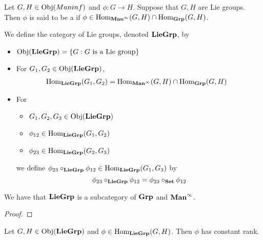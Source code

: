 \documentclass{book}
\begin{document}
\begin{ex}
	Let $G, H \in \Obj(Maninf)$ and $\phi: G \rightarrow H$. Suppose that $G, H$ are Lie groups. Then $\phi$ is said to be a  if $\phi \in \Hom_{\Maninf}(G, H) \cap \Hom_{\Grp}(G, H)$.
\end{ex}

\begin{defn}
	We define the category of Lie groups, denoted $\LieGrp$, by 
	\begin{itemize}
		\item $\Obj(\LieGrp) = \{G: G \text{ is a Lie group} \}$ 
		\item For $G_1, G_2 \in \Obj(\LieGrp)$, 
		\begin{align*}
			& \Hom_{\LieGrp}(G_1, G_2) = \Hom_{\Maninf}(G, H) \cap \Hom_{\Grp}(G, H)
		\end{align*}
		\item For 
		\begin{itemize}
			\item $G_1, G_2, G_3 \in \Obj(\LieGrp)$ 
			\item $\phi_{12} \in \Hom_{\LieGrp}(G_1, G_2)$
			\item $\phi_{23} \in \Hom_{\LieGrp}(G_2, G_3)$
		\end{itemize}
		we define $ \phi_{23} \circ_{\LieGrp} \phi_{12} \in \Hom_{\LieGrp}(G_1, G_3)$ by 
		$$ \phi_{23} \circ_{\LieGrp} \phi_{12} = \phi_{23} \circ_{\Set} \phi_{12}$$
	\end{itemize}
\end{defn}

\begin{ex}
	We have that $\LieGrp$ is a subcategory of $\Grp$ and $\Maninf$.
\end{ex}

\begin{proof}
\end{proof}

\begin{ex}
	Let $G, H \in \Obj(\LieGrp)$ and $\phi \in \Hom_{\LieGrp}(G, H)$. Then $\phi$ has constant rank. 
\end{ex}
\end{document}

